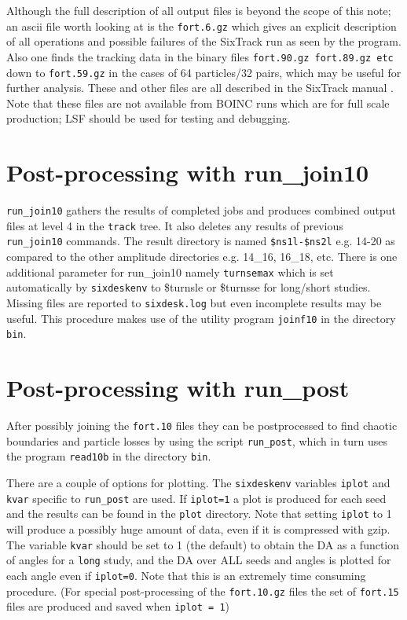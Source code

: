 \documentclass{article}    %
\begin{document}
Although the full description of all output files is beyond the scope
of this note; an ascii file worth
looking at is the {\tt fort.6.gz} which gives an explicit description of
all operations and possible failures of the SixTrack run as seen by
the program. Also one finds the tracking data in the
binary files {\tt fort.90.gz fort.89.gz etc} down to {\tt fort.59.gz}
in the cases of 64 particles/32 pairs, 
which may be useful for further
analysis. These and other files are all described in the
SixTrack manual \cite{SixTrack}. Note that these files are not available
from BOINC runs which are for full scale production; LSF should be used
for testing and debugging. 

\section{Post-processing with run\_join10}
{\tt run\_join10} gathers the results of completed jobs and
produces combined output files at level 4 in the {\tt track} tree. 
It also deletes any results of previous {\tt run\_join10} commands.
The result directory is named {\tt \$ns1l-\$ns2l} e.g. 14-20 as compared to the
other amplitude directories e.g. 14\_16, 16\_18, etc.
There is one additional parameter for run\_join10 namely
{\tt turnsemax} which is set automatically by {\tt sixdeskenv} 
to \$turnsle or \$turnsse
for long/short studies. Missing files are reported to {\tt sixdesk.log}
but even incomplete results may be useful. This procedure makes use
of the utility program {\tt joinf10} in the directory {\tt bin}.

\section{Post-processing with run\_post}
%
\label{sec:run_post}
After possibly joining the {\tt fort.10} files they can be
postprocessed to find chaotic boundaries and particle losses by using
the script {\tt run\_post}, which in turn uses the program {\tt read10b}
in the directory {\tt bin}.  

There are a couple of options for plotting.
The  {\tt sixdeskenv} variables {\tt iplot} and {\tt kvar} specific to {\tt run\_post} are used.
If {\tt iplot=1} a plot is produced for each seed and the results
can be found in the {\tt plot} directory. Note that setting 
{\tt iplot} to 1 will produce a
possibly huge amount of data, even if it is compressed with gzip.
The variable {\tt kvar} should be set to 1 (the default) to 
obtain the DA as a function of angles for a {\tt long} study,
and the DA over ALL seeds and angles is plotted for each angle
even if {\tt iplot=0}. Note that this is an extremely time consuming
procedure. (For special post-processing of the 
{\tt fort.10.gz} files the set of {\tt fort.15} files are
produced and saved when {\tt iplot = 1})
\end{document}
